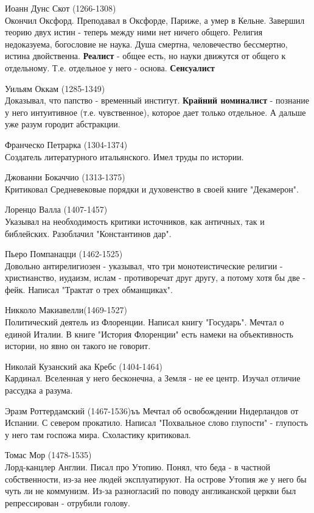 Иоанн Дунс Скот (1266-1308)\\
Окончил Оксфорд. Преподавал в Оксфорде, Париже, а умер в Кельне. Завершил теорию двух истин - теперь между ними нет ничего общего. Религия недоказуема, богословие не наука. Душа смертна, человечество бессмертно, истина двойственна. \textbf{Реалист} - общее есть, но науки движутся от общего к отдельному. Т.е. отдельное у  него - основа. \textbf{Сенсуалист}
 
Уильям Оккам (1285-1349)\\
Доказывал, что папство - временный институт. \textbf{Крайний номиналист} - познание у него интуитивное (т.е. чувственное), которое дает только отдельное. А дальше уже разум городит абстракции.

Франческо Петрарка (1304-1374)\\
Создатель литературного итальянского. Имел труды по истории.

Джованни Бокаччио (1313-1375)\\ 
Критиковал Средневековые порядки и духовенство в своей книге "Декамерон". 

Лоренцо Валла (1407-1457)\\
Указывал на необходимость критики источников, как античных, так и библейских. Разоблачил "Константинов дар".

Пьеро Помпанацци (1462-1525)\\
Довольно антирелигиозен - указывал, что три монотеистические религии - христианство, иудаизм, ислам - противоречат друг другу, а потому хотя бы две -  фейк. Написал "Трактат о трех обманщиках".

Никколо Макиавелли(1469-1527)\\
Политический деятель из Флоренции. Написал книгу "Государь". Мечтал о единой Италии. В книге "История Флоренции" есть намеки на объективность истории, но явно он такого не говорит.

Николай Кузанский ака Кребс (1404-1464)\\
Кардинал. Вселенная у него бесконечна, а Земля - не ее центр. Изучал отличие рассудка а разума.

Эразм Роттердамский (1467-1536)ъъ
Мечтал об освобождении Нидерландов от Испании. С севером прокатило. Написал "Похвальное слово глупости" - глупость у него там госпожа мира. Схоластику критиковал.

Томас Мор (1478-1535)\\
Лорд-канцлер Англии. Писал про Утопию. Понял, что беда - в частной собственности, из-за нее людей эксплуатируют. На острове Утопия же у него бы чуть ли не коммунизм. Из-за разногласий по поводу англиканской церкви был репрессирован - отрубили голову.


